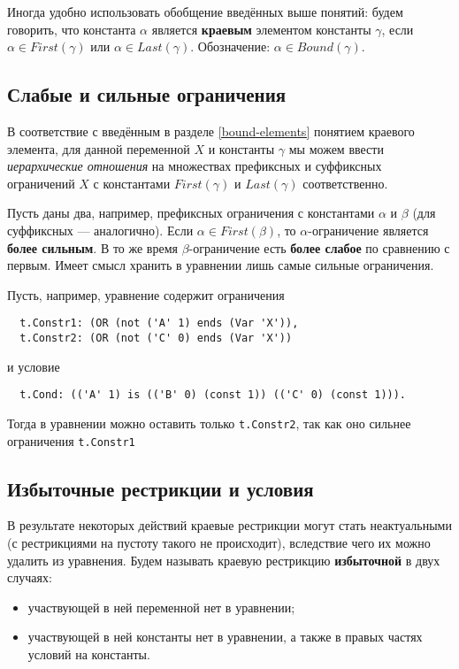 \documentclass[12pt]{article}
\begin{document}
Иногда удобно использовать обобщение введённых выше понятий: будем
говорить, что константа $\alpha$ является \textbf{краевым} элементом константы
$\gamma$, если $\alpha \in First(\gamma)$ или $\alpha \in Last(\gamma)$.
Обозначение: $\alpha \in Bound(\gamma)$.


\subsection{Слабые и сильные ограничения}

В соответствие с введённым в разделе \ref{bound-elements} понятием краевого
элемента, для данной переменной $X$ и константы $\gamma$ мы можем ввести
\textit{иерархические отношения} на множествах префиксных и суффиксных
ограничений $X$ с константами $First(\gamma)$ и $Last(\gamma)$ соответственно.

Пусть даны два, например, префиксных ограничения с константами $\alpha$ и
$\beta$ (для суффиксных --- аналогично). Если $\alpha \in First(\beta)$, то
$\alpha$-ограничение является \textbf{более сильным}. В то же время
$\beta$-ограничение есть \textbf{более слабое} по сравнению с первым. Имеет
смысл хранить в уравнении лишь самые сильные ограничения.

Пусть, например, уравнение содержит ограничения
\begin{Verbatim}
  t.Constr1: (OR (not ('A' 1) ends (Var 'X')),
  t.Constr2: (OR (not ('C' 0) ends (Var 'X'))
\end{Verbatim}
и условие
\begin{Verbatim}
  t.Cond: (('A' 1) is (('B' 0) (const 1)) (('C' 0) (const 1))).
\end{Verbatim}
Тогда в уравнении можно оставить только \texttt{t.Constr2}, так как оно
сильнее ограничения \texttt{t.Constr1}


\subsection{Избыточные рестрикции и условия}

В результате некоторых действий краевые рестрикции могут стать неактуальными
(с рестрикциями на пустоту такого не происходит), вследствие чего их
можно удалить из уравнения. Будем называть краевую рестрикцию
\textbf{избыточной} в двух случаях:
\begin{itemize}
  \item участвующей в ней переменной нет в уравнении;
  \item участвующей в ней константы нет в уравнении, а также в правых частях
  условий на константы.
\end{itemize}
\end{document}
